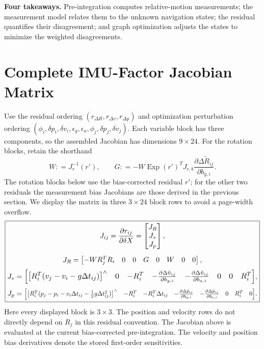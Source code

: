 \documentclass[11pt,a4paper]{article}
\newcommand{\Exp}{\operatorname{Exp}}
\newcommand{\defeq}{\mathrel{\mathop:}=}
\begin{document}
\noindent\textbf{Four takeaways.}
Pre-integration computes relative-motion measurements; the measurement
model relates them to the unknown navigation states; the residual
quantifies their disagreement; and graph optimization adjusts the
states to minimize the weighted disagreements.

\appendix
\section{Complete IMU-Factor Jacobian Matrix}
Use the residual ordering $(r_{\Delta R},r_{\Delta v},r_{\Delta p})$
and optimization perturbation ordering
$(\phi_i,\delta p_i,\delta v_i,\epsilon_g,\epsilon_a,
\phi_j,\delta p_j,\delta v_j)$.
Each variable block has three components, so the assembled Jacobian
has dimensions $9\times24$. For the rotation blocks, retain the shorthand
\begin{equation}
W\defeq J_r^{-1}(r'),\qquad
G\defeq-W\Exp(r')^TJ_{r,b}\frac{\partial\Delta\tilde R_{ij}}{\partial b_{g,i}}.
\end{equation}
The rotation blocks below use the bias-corrected residual $r'$;
for the other two residuals the measurement bias Jacobians are
those derived in the previous section. We display the matrix in
three $3\times24$ block rows to avoid a page-width overflow.
\begin{equation}\label{eq:imu_factor_full_jacobian}
\boxed{\begin{gathered}
\displaystyle J_{ij}=\frac{\partial r_{ij}}{\partial\delta X}
=\begin{bmatrix}J_R\\J_v\\J_p\end{bmatrix},\\[2mm]
J_R=\begin{bmatrix}
-WR_j^TR_i&0&0&G&0&W&0&0
\end{bmatrix},\\[1mm]
J_v=\resizebox{.94\textwidth}{!}{$\begin{bmatrix}
\bigl[R_i^T(v_j-v_i-g\Delta t_{ij})\bigr]^\wedge&0&-R_i^T&-\frac{\partial\Delta\tilde v_{ij}}{\partial b_{g,i}}&-\frac{\partial\Delta\tilde v_{ij}}{\partial b_{a,i}}&0&0&R_i^T
\end{bmatrix}$},\\[1mm]
J_p=\resizebox{.94\textwidth}{!}{$\begin{bmatrix}
\bigl[R_i^T(p_j-p_i-v_i\Delta t_{ij}-\tfrac12g\Delta t_{ij}^2)\bigr]^\wedge&-R_i^T&-R_i^T\Delta t_{ij}&-\frac{\partial\Delta\tilde p_{ij}}{\partial b_{g,i}}&-\frac{\partial\Delta\tilde p_{ij}}{\partial b_{a,i}}&0&R_i^T&0
\end{bmatrix}$}.
\end{gathered}}
\end{equation}
Here every displayed block is $3\times3$. The position and
velocity rows do not directly depend on $R_j$ in this residual
convention. The Jacobian above is evaluated at the current bias-corrected pre-integration. The velocity and position bias derivatives denote the stored first-order sensitivities.
\end{document}
